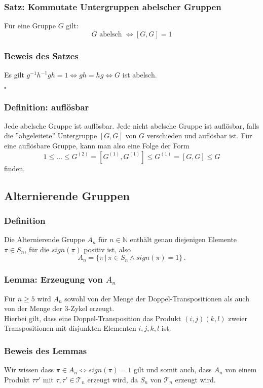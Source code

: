 \documentclass[12pt, german]{article}
\newcommand{\N}{\mathbb{N}}
\newcommand{\bewiesen}{
	
	\begin{flushright}
		$\square$  \\
\end{flushright}}
\begin{document}
	\subsubsection{Satz: Kommutate Untergruppen abelscher Gruppen}
	Für eine Gruppe $G$ gilt: $$ G \text{ abelsch } \iff [G, G] = 1$$
	
	\subsubsection{Beweis des Satzes}
	Es gilt $g^{-1}h^{-1}gh = 1 \iff gh = hg \iff G$ ist abelsch. 
	\bewiesen
	
	\subsubsection{Definition: auflösbar}
	Jede abelsche Gruppe ist auflösbar. Jede nicht abelsche Gruppe ist auflösbar, falls die ''abgeleitete'' Untergruppe $[G, G]$ von $G$ verschieden und auflösbar ist. 
	Für eine auflösbare Gruppe, kann man also eine Folge der Form
	\begin{equation*}
		1 \leq \ldots \leq G^{(2)} = [G^{(1)}, G^{(1)} ] \leq G^{(1)} = [G, G ] \leq G  
	\end{equation*}
	finden.
	
	\subsection{Alternierende Gruppen}
	
	\subsubsection{Definition}
	Die Alternierende Gruppe $A_n$ für $n \in \N$ enthält genau diejenigen Elemente $\pi \in S_n$, für die $sign(\pi)$ positiv ist, also $$A_n=\{\pi\, | \, \pi \in S_n \wedge sign(\pi) = 1\}\, .$$
	\subsubsection{Lemma: Erzeugung von $A_n$}
	Für $n \geq 5$ wird $A_n$ sowohl von der Menge der Doppel-Transpositionen als auch von der Menge der $3$-Zykel erzeugt.\\
	Hierbei gilt, dass eine Doppel-Transposition das Produkt $(i,j)(k,l)$ zweier Transpositionen mit disjunkten Elementen $i,j,k,l$ ist.
	
	\subsubsection{Beweis des Lemmas}
	Wir wissen dass $\pi \in A_n \iff sign(\pi) = 1$ gilt und somit auch, dass $A_n$ von einem Produkt $\tau \tau'$ mit $\tau, \tau' \in \mathcal T_n$ erzeugt wird, 
	da $S_n$ von $\mathcal T_n$ erzeugt wird. 
	\newline 
	
\end{document}
